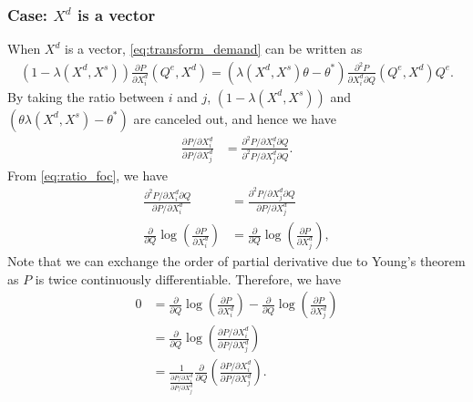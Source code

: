 \documentclass[11pt, a4paper]{article}
\theoremstyle{remark}
\begin{document}
\subsubsection*{Case: $X^{d}$ is a vector}
When $X^{d}$ is a vector, \eqref{eq:transform_demand} can be written as
\begin{align}
    (1 -  \lambda(X^{d}, X^{s}))\frac{\partial P}{\partial X^{d}_{i}}(Q^e, X^{d}) = (  \lambda(X^{d}, X^{s})\theta  - \theta^*)\frac{\partial^2 P}{\partial X^{d}_{i}\partial Q}(Q^e, X^{d})Q^e.
\end{align}
By taking the ratio between $i$ and $j$, $(1 - \lambda(X^{d}, X^{s}))$ and  $(\theta\lambda(X^{d}, X^{s}) - \theta^{*})$ are canceled out, and hence we have
\begin{align}
    \frac{\partial P/\partial X^{d}_{i}}{\partial P/\partial X^{d}_{j}} & = \frac{\partial^2 P/\partial X^{d}_{i} \partial Q}{\partial^2 P/\partial X^{d}_{j} \partial Q}. \label{eq:ratio_foc}
\end{align}
From \eqref{eq:ratio_foc}, we have
\begin{align}
    \frac{\partial^2 P/\partial X^{d}_{i} \partial Q}{\partial P/\partial X^{d}_{i}}  &= \frac{\partial^2 P/\partial X^{d}_{j} \partial Q}{\partial P/\partial X^{d}_{j}}\\ 
    \frac{\partial }{\partial Q} \log\left( \frac{\partial P}{\partial X^{d}_{i}}\right) &= \frac{\partial }{\partial Q} \log\left( \frac{\partial P}{\partial X^{d}_{j}}\right),
\end{align}
Note that we can exchange the order of partial derivative due to Young's theorem as $P$ is twice continuously differentiable.
Therefore, we have
\begin{align}
    0 & = \frac{\partial }{\partial Q} \log\left( \frac{\partial P}{\partial X^{d}_{i}}\right) - \frac{\partial }{\partial Q} \log\left( \frac{\partial P}{\partial X^{d}_{j}}\right)\\
    & = \frac{\partial}{\partial Q}\log\left(\frac{\partial P/\partial X^{d}_{i}}{\partial P/\partial X^{d}_{j}}\right)\\
    & = \frac{1}{\frac{\partial P/\partial X^{d}_{i}}{\partial P/\partial X^{d}_{j}}} \frac{\partial}{\partial Q} \left(\frac{\partial P/\partial X^{d}_{i}}{\partial P/\partial X^{d}_{j}}\right).
    \label{eq:derivative_separable}
\end{align}
\end{document}
